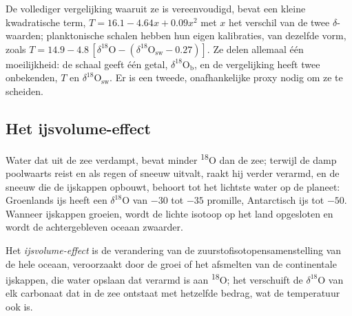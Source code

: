 De vollediger vergelijking waaruit ze is vereenvoudigd, bevat een kleine kwadratische term,
$T = 16.1 - 4.64x + 0.09x^2$ met $x$ het verschil van de twee $\delta$-waarden; planktonische schalen
hebben hun eigen kalibraties, van dezelfde vorm, zoals $T = 14.9 - 4.8\,[\delta^{18}\mathrm{O} -
(\delta^{18}\mathrm{O}_{\mathrm{sw}} - 0.27)]$. Ze delen allemaal één moeilijkheid: de schaal geeft één
getal, $\delta^{18}\mathrm{O}_{\mathrm{b}}$, en de vergelijking heeft twee onbekenden, $T$ en
$\delta^{18}\mathrm{O}_{\mathrm{sw}}$. Er is een tweede, onafhankelijke proxy nodig om ze te scheiden.

\subsection*{Het ijsvolume-effect}

Water dat uit de zee verdampt, bevat minder \textsuperscript{18}O dan de zee; terwijl de damp
poolwaarts reist en als regen of sneeuw uitvalt, raakt hij verder verarmd, en de sneeuw die de
ijskappen opbouwt, behoort tot het lichtste water op de planeet: Groenlands ijs heeft een $\delta^{18}$O van $-30$ tot $-35$
promille, Antarctisch ijs tot $-50$. Wanneer ijskappen groeien, wordt de lichte isotoop op het land opgesloten
en wordt de achtergebleven oceaan zwaarder.

\begin{definition}\label{def:b2:climate-proxies:ice-volume}
Het \emph{ijsvolume-effect} is de verandering van de
zuurstofisotopensamenstelling van de hele oceaan, veroorzaakt door de groei of het afsmelten van de continentale ijskappen, die
water opslaan dat verarmd is aan \textsuperscript{18}O; het verschuift de $\delta^{18}$O van elk carbonaat
dat in de zee ontstaat met hetzelfde bedrag, wat de temperatuur ook is.
\end{definition}


